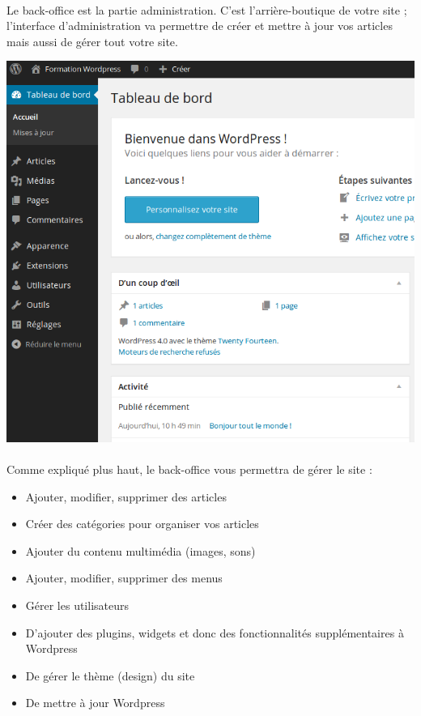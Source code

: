 \documentclass[10pt,a4paper]{article}
\begin{document}
\paragraph{}Le back-office est la partie administration. C'est l’arrière-boutique de votre site ; l'interface d’administration va permettre de créer et mettre à jour vos articles mais aussi de gérer tout votre site.
\begin{center}
\includegraphics[scale=0.5]{img/0046.png}
\end{center}
\paragraph{}Comme expliqué plus haut, le back-office vous permettra de gérer le site :
\begin{itemize}
\item Ajouter, modifier, supprimer des articles
\item Créer des catégories pour organiser vos articles
\item Ajouter du contenu multimédia (images, sons)
\item Ajouter, modifier, supprimer des menus
\item Gérer les utilisateurs
\item D'ajouter des plugins, widgets et donc des fonctionnalités supplémentaires à Wordpress
\item De gérer le thème (design) du site
\item De mettre à jour Wordpress
\end{itemize}
\end{document}
